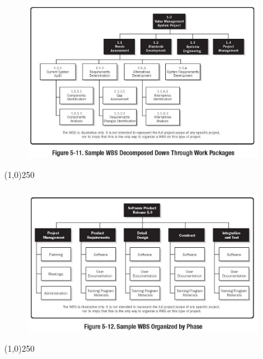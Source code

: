 \begin{frame}
\frametitle{}
\begin{figure}
	\centering
		\includegraphics[width = 10cm]{images/fig5-11.jpg}
	\label{fig:5-11}
\end{figure}
\end{frame}\begin{center}\line(1,0){250}\end{center}




\begin{frame}
\frametitle{}
\begin{figure}
	\centering
		\includegraphics[width = 10cm]{images/fig5-12.jpg}
	\label{fig:5-12}
\end{figure}
\end{frame}\begin{center}\line(1,0){250}\end{center}




